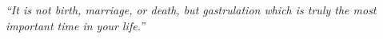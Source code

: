 
 







\newpage

\vspace*{10px}

\textit{“It is not birth, marriage, or death, but gastrulation which is truly the most important time in your life.”}\\

\vspace*{5px}

